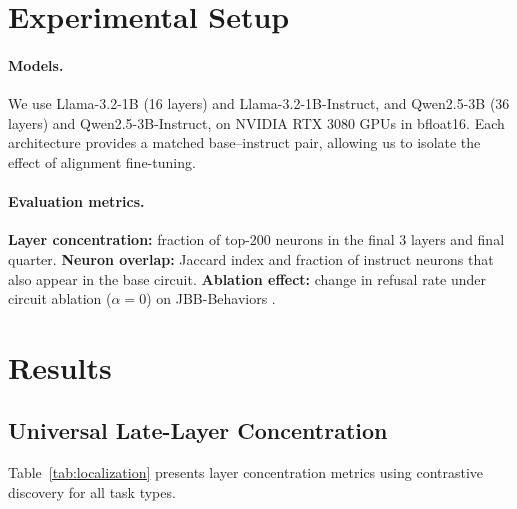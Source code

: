 \documentclass{article}
\begin{document}
\section{Experimental Setup}
\label{sec:setup}

\paragraph{Models.}
We use Llama-3.2-1B (16 layers) and Llama-3.2-1B-Instruct, and Qwen2.5-3B (36 layers) and Qwen2.5-3B-Instruct, on NVIDIA RTX 3080 GPUs in bfloat16.
Each architecture provides a matched base--instruct pair, allowing us to isolate the effect of alignment fine-tuning.

\paragraph{Evaluation metrics.}
\textbf{Layer concentration:} fraction of top-200 neurons in the final 3 layers and final quarter.
\textbf{Neuron overlap:} Jaccard index and fraction of instruct neurons that also appear in the base circuit.
\textbf{Ablation effect:} change in refusal rate under circuit ablation ($\alpha=0$) on JBB-Behaviors \citep{chao2024jailbreakbench}.

\section{Results}
\label{sec:results}

\subsection{Universal Late-Layer Concentration}
\label{sec:localization}

Table~\ref{tab:localization} presents layer concentration metrics using contrastive discovery for all task types.
\end{document}
